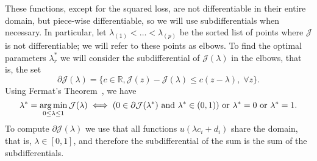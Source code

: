%
These functions, except for the squared loss, are not differentiable in their entire domain, but piece-wise differentiable, so we will use subdifferentials when necessary.  In particular, let ${\lambda}_{(1)} < \ldots < {\lambda}_{(p)}$ be the sorted list of points where $\mathcal{J}$ is not differentiable; we will refer to these points as elbows.
To find the optimal parameters $\lambda_r^*$ we will consider the subdifferential of $\mathcal{J}(\lambda)$ in the elbows, that is, the set $$\partial \mathcal{J}(\lambda) = \{c \in \mathbb{R}, \mathcal{J}(z)-\mathcal{J}(\lambda) \leq c (z - \lambda), \;  \forall z \} .$$
%
Using Fermat's Theorem~\citep{BauschkeC11}, we have
\begin{equation}
    \nonumber
    \lambda^* = \operatorname*{arg\min}_{0 \leq \lambda \leq 1} \mathcal{J}(\lambda) \iff (0 \in \partial \mathcal{J}(\lambda^*) \text{ and } \lambda^* \in (0, 1) ) \text{ or } \lambda^*=0 \text{ or } \lambda^*=1 .
\end{equation}
To compute $\partial \mathcal{J}(\lambda)$ we use that all functions $u(\lambda c_i + d_i)$ share the domain, that is, $\lambda \in [0, 1]$, and therefore the subdifferential of the sum is the sum of the subdifferentials.
%


